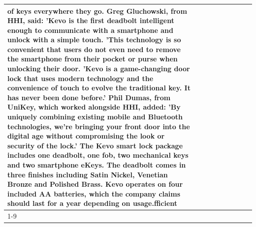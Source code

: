 \begin{table}[H]
\begin{tabular}{lllrlllll}
of keys everywhere they go. Greg Gluchowski, from HHI, said: 'Kevo is the first deadbolt intelligent enough to communicate with a smartphone and unlock with a simple touch. 'This technology is so convenient that users do not even need to remove the smartphone from their pocket or purse when unlocking their door. 'Kevo is a game-changing door lock that uses modern technology and the convenience of touch to evolve the traditional key. It has never been done before.' Phil Dumas, from UniKey, which worked alongside HHI, added: 'By uniquely combining existing mobile and Bluetooth technologies, we’re bringing your front door into the digital age without compromising the look or security of the lock.' The Kevo smart lock package includes one deadbolt, one fob, two mechanical keys and two smartphone eKeys. The deadbolt comes in three finishes including Satin Nickel, Venetian Bronze and Polished Brass. Kevo operates on four included AA batteries, which the company claims should last for a year depending on usage.fficient \\
\cline{1-9}

\end{tabular}
\end{table}
